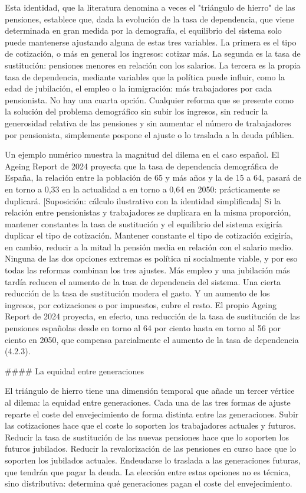 \documentclass[10pt,a4paper]{article}
\begin{document}
Esta identidad, que la literatura denomina a veces el "triángulo de hierro" de las pensiones, establece que, dada la evolución de la tasa de dependencia, que viene determinada en gran medida por la demografía, el equilibrio del sistema solo puede mantenerse ajustando alguna de estas tres variables. La primera es el tipo de cotización, o más en general los ingresos: cotizar más. La segunda es la tasa de sustitución: pensiones menores en relación con los salarios. La tercera es la propia tasa de dependencia, mediante variables que la política puede influir, como la edad de jubilación, el empleo o la inmigración: más trabajadores por cada pensionista. No hay una cuarta opción. Cualquier reforma que se presente como la solución del problema demográfico sin subir los ingresos, sin reducir la generosidad relativa de las pensiones y sin aumentar el número de trabajadores por pensionista, simplemente pospone el ajuste o lo traslada a la deuda pública.

Un ejemplo numérico muestra la magnitud del dilema en el caso español. El Ageing Report de 2024 proyecta que la tasa de dependencia demográfica de España, la relación entre la población de 65 y más años y la de 15 a 64, pasará de en torno a 0,33 en la actualidad a en torno a 0,64 en 2050: prácticamente se duplicará. [Suposición: cálculo ilustrativo con la identidad simplificada] Si la relación entre pensionistas y trabajadores se duplicara en la misma proporción, mantener constantes la tasa de sustitución y el equilibrio del sistema exigiría duplicar el tipo de cotización. Mantener constante el tipo de cotización exigiría, en cambio, reducir a la mitad la pensión media en relación con el salario medio. Ninguna de las dos opciones extremas es política ni socialmente viable, y por eso todas las reformas combinan los tres ajustes. Más empleo y una jubilación más tardía reducen el aumento de la tasa de dependencia del sistema. Una cierta reducción de la tasa de sustitución modera el gasto. Y un aumento de los ingresos, por cotizaciones o por impuestos, cubre el resto. El propio Ageing Report de 2024 proyecta, en efecto, una reducción de la tasa de sustitución de las pensiones españolas desde en torno al 64 por ciento hasta en torno al 56 por ciento en 2050, que compensa parcialmente el aumento de la tasa de dependencia (4.2.3).

#### La equidad entre generaciones

El triángulo de hierro tiene una dimensión temporal que añade un tercer vértice al dilema: la equidad entre generaciones. Cada una de las tres formas de ajuste reparte el coste del envejecimiento de forma distinta entre las generaciones. Subir las cotizaciones hace que el coste lo soporten los trabajadores actuales y futuros. Reducir la tasa de sustitución de las nuevas pensiones hace que lo soporten los futuros jubilados. Reducir la revalorización de las pensiones en curso hace que lo soporten los jubilados actuales. Endeudarse lo traslada a las generaciones futuras, que tendrán que pagar la deuda. La elección entre estas opciones no es técnica, sino distributiva: determina qué generaciones pagan el coste del envejecimiento.
\end{document}
